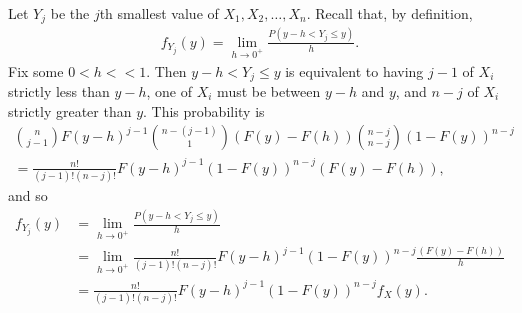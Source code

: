 Let $Y_j$ be the $j$th smallest value of $X_1, X_2, \ldots, X_n$. Recall that, by definition,
\begin{align*}
    f_{Y_j}(y) = \lim_{h \to 0^{+}}\frac{P(y-h < Y_j \leq y)}{h}.
\end{align*}
Fix some $0 < h << 1$. Then $y-h < Y_j \leq y$ is equivalent to having $j-1$ of $X_i$ strictly less than $y-h$, one of $X_i$ must be between $y-h$ and $y$, and $n-j$ of $X_i$ strictly greater than $y$. This probability is
\begin{align*}
    \binom{n}{j-1}F(y-h)^{j-1}\binom{n-(j-1)}{1}\left(F(y)-F(h)\right)\binom{n-j}{n-j}\left(1-F(y)\right)^{n-j} \\
    = \frac{n!}{(j-1)!(n-j)!}F(y-h)^{j-1}\left(1-F(y)\right)^{n-j}\left(F(y)-F(h)\right),
\end{align*}
and so
\begin{align*}
    f_{Y_j}(y) &= \lim_{h \to 0^{+}}\frac{P(y-h<Y_j\leq y)}{h} \\
    &= \lim_{h \to 0^{+}}\frac{n!}{(j-1)!(n-j)!}F(y-h)^{j-1}\left(1-F(y)\right)^{n-j}\frac{\left(F(y)-F(h)\right)}{h} \\
    &= \frac{n!}{(j-1)!(n-j)!}F(y-h)^{j-1}\left(1-F(y)\right)^{n-j}f_X(y).
\end{align*}
